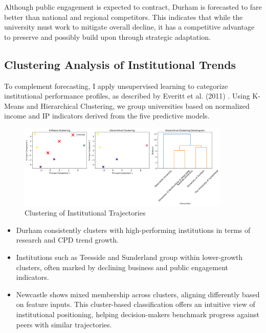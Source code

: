 \documentclass[journal,onecolumn, 10pt,draftclsnofoot]{IEEEtran}
\begin{document}
Although public engagement is expected to contract, Durham is forecasted to fare better than national and regional competitors. This indicates that while the university must work to mitigate overall decline, it has a competitive advantage to preserve and possibly build upon through strategic adaptation.

\subsection{Clustering Analysis of Institutional Trends}

To complement forecasting, I apply unsupervised learning to categorize institutional performance profiles, as described by Everitt et al. (2011) \cite{everitt2011cluster}. Using K-Means and Hierarchical Clustering, we group universities based on normalized income and IP indicators derived from the five predictive models.



\begin{figure}[h]
\centering
\includegraphics[width=0.9\textwidth]{Fig/figure44.clustering_analysis.png}
\caption{Clustering of Institutional Trajectories}
\label{fig:clustering-analysis}
\end{figure}

\begin{itemize}
    \item Durham consistently clusters with high-performing institutions in terms of research and CPD trend growth.
    \item Institutions such as Teesside and Sunderland group within lower-growth clusters, often marked by declining business and public engagement indicators.
    \item Newcastle shows mixed membership across clusters, aligning differently based on feature inputs. This cluster-based classification offers an intuitive view of institutional positioning, helping decision-makers benchmark progress against peers with similar trajectories.
\end{itemize}
\end{document}

